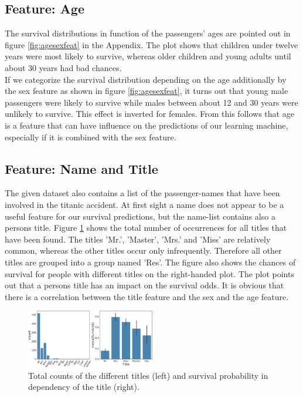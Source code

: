 \subsection*{Feature: Age}
\label{sec:age}
The survival distributions in function of the passengers' ages are pointed out in figure \ref{fig:agesexfeat} in the Appendix. The plot shows that children under twelve years were most likely to survive, whereas older children and young adults until about 30 years had bad chances.\\ 
If we categorize the survival distribution depending on the age additionally by the sex feature as shown in figure \ref{fig:agesexfeat}, it turns out that young male passengers were likely to survive while males between about 12 and 30 years were unlikely to survive. This effect is inverted for females. From this follows that age is a feature that can have influence on the predictions of our learning machine, especially if it is combined with the sex feature.


 
 \subsection*{Feature: Name and Title}
The given dataset also contains a list of the passenger-names that have been involved in the titanic accident. At first sight a name does not appear to be a useful feature for our survival predictions, but the name-list contains also a persons title. Figure \ref{fig:title} shows the total number of occurrences for all titles that have been found. The titles 'Mr.', 'Master', 'Mrs.' and 'Miss' are relatively common, whereas the other titles occur only infrequently. Therefore all other titles are grouped into a group named 'Res'. The figure also shows the chances of survival for people with different titles on the right-handed plot. The plot points out that a persons title has an impact on the survival odds. It is obvious that there is a correlation between the title feature and the sex and the age feature.

 \begin{figure}
 \centering
     \includegraphics[width=0.5\textwidth]{media_saved/title}
     \caption{Total counts of the different titles (left) and survival probability in dependency of the title (right).}
     \label{fig:title}
 \end{figure}
 

